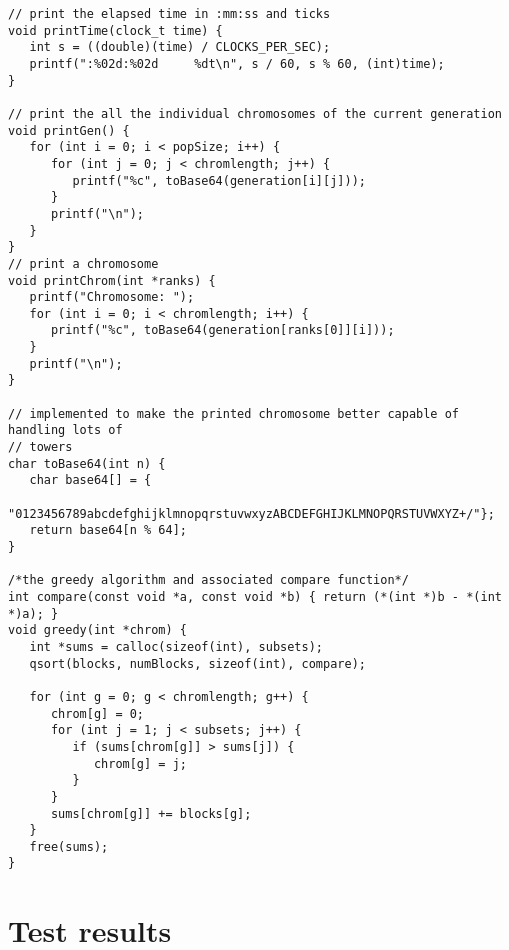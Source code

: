 \documentclass[a4paper,10pt]{article}
\begin{document}
\begin{lstlisting}[style = code, title = parprob.c]
// print the elapsed time in :mm:ss and ticks
void printTime(clock_t time) {
   int s = ((double)(time) / CLOCKS_PER_SEC);
   printf(":%02d:%02d     %dt\n", s / 60, s % 60, (int)time);
}

// print the all the individual chromosomes of the current generation
void printGen() {
   for (int i = 0; i < popSize; i++) {
      for (int j = 0; j < chromlength; j++) {
         printf("%c", toBase64(generation[i][j]));
      }
      printf("\n");
   }
}
// print a chromosome
void printChrom(int *ranks) {
   printf("Chromosome: ");
   for (int i = 0; i < chromlength; i++) {
      printf("%c", toBase64(generation[ranks[0]][i]));
   }
   printf("\n");
}

// implemented to make the printed chromosome better capable of handling lots of
// towers
char toBase64(int n) {
   char base64[] = {
       "0123456789abcdefghijklmnopqrstuvwxyzABCDEFGHIJKLMNOPQRSTUVWXYZ+/"};
   return base64[n % 64];
}

/*the greedy algorithm and associated compare function*/
int compare(const void *a, const void *b) { return (*(int *)b - *(int *)a); }
void greedy(int *chrom) {
   int *sums = calloc(sizeof(int), subsets);
   qsort(blocks, numBlocks, sizeof(int), compare);

   for (int g = 0; g < chromlength; g++) {
      chrom[g] = 0;
      for (int j = 1; j < subsets; j++) {
         if (sums[chrom[g]] > sums[j]) {
            chrom[g] = j;
         }
      }
      sums[chrom[g]] += blocks[g];
   }
   free(sums);
}
\end{lstlisting}
\newpage
\section{Test results}
\end{document}
